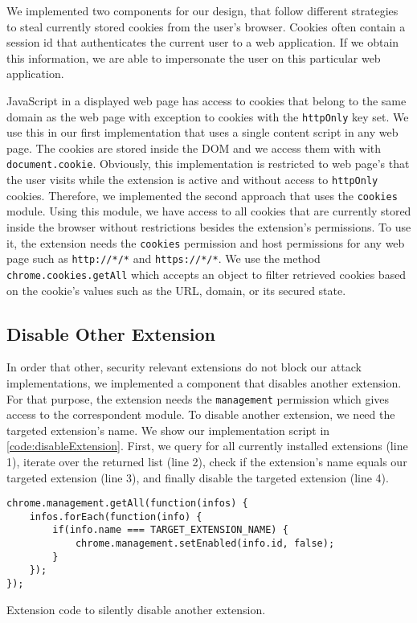 	We implemented two components for our design, that follow different strategies to steal currently stored cookies from the user's browser. Cookies often contain a session id that authenticates the current user to a web application. If we obtain this information, we are able to impersonate the user on this particular web application. 
	
	JavaScript in a displayed web page has access to cookies that belong to the same domain as the web page with exception to cookies with the \texttt{httpOnly} key set. We use this in our first implementation that uses a single content script in any web page. The cookies are stored inside the DOM and we access them with with \texttt{document.cookie}. Obviously, this implementation is restricted to web page's that the user visits while the extension is active and without access to \texttt{httpOnly} cookies. Therefore, we implemented the second approach that uses the \texttt{cookies} module. Using this module, we have access to all cookies that are currently stored inside the browser without restrictions besides the extension's permissions. To use it, the extension needs the \texttt{cookies} permission and host permissions for any web page such as \texttt{http://*/*} and \texttt{https://*/*}. We use the method \texttt{chrome.cookies.getAll} which accepts an object to filter retrieved cookies based on the cookie's values such as the URL, domain, or its secured state.
 

\subsection{Disable Other Extension}

	In order that other, security relevant extensions do not block our attack implementations, we implemented a component that disables another extension. For that purpose, the extension needs the \texttt{management} permission which gives access to the correspondent module. To disable another extension, we need the targeted extension's name. We show our implementation script in \autoref{code:disableExtension}. First, we query for all currently installed extensions (line 1), iterate over the returned list (line 2), check if the extension's name equals our targeted extension (line 3), and finally disable the targeted extension (line 4). 

	\begin{code}
		\begin{lstlisting}
chrome.management.getAll(function(infos) {
	infos.forEach(function(info) {
		if(info.name === TARGET_EXTENSION_NAME) {
			chrome.management.setEnabled(info.id, false);
		}
	});
});
\end{lstlisting}
		\caption{Extension code to silently disable another extension.}
		\label{code:disableExtension}
	\end{code}



